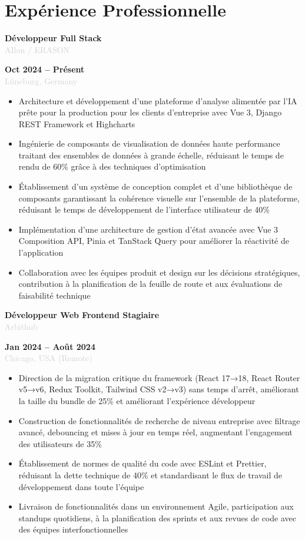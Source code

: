 \documentclass[10pt,a4paper]{article}
\newcommand{\Experience}[4]{%
  \vspace{2pt}
  \noindent
  \begin{minipage}[t]{0.70\textwidth}
    {\normalsize\textbf{\color{darkgray}#3}} \\
    \textcolor{lightgray}{\small #1}
  \end{minipage}%
  \hfill
  \begin{minipage}[t]{0.28\textwidth}
    \raggedleft
    \textcolor{mediumgray}{\small\textbf{#4}} \\
    \textcolor{lightgray}{\small #2}
  \end{minipage}
  \vspace{1pt}
}
\begin{document}
\section*{Expérience Professionnelle}

\Experience{AIlon / ERASON}{Lüneburg, Germany}{Développeur Full Stack}{Oct 2024 -- Présent}
\begin{itemize}
  \item Architecture et développement d'une plateforme d'analyse alimentée par l'IA prête pour la production pour les clients d'entreprise avec Vue 3, Django REST Framework et Highcharts
  \item Ingénierie de composants de visualisation de données haute performance traitant des ensembles de données à grande échelle, réduisant le temps de rendu de 60\% grâce à des techniques d'optimisation
  \item Établissement d'un système de conception complet et d'une bibliothèque de composants garantissant la cohérence visuelle sur l'ensemble de la plateforme, réduisant le temps de développement de l'interface utilisateur de 40\%
  \item Implémentation d'une architecture de gestion d'état avancée avec Vue 3 Composition API, Pinia et TanStack Query pour améliorer la réactivité de l'application
  \item Collaboration avec les équipes produit et design sur les décisions stratégiques, contribution à la planification de la feuille de route et aux évaluations de faisabilité technique
\end{itemize}

\Experience{Arbithub}{Chicago, USA (Remote)}{Développeur Web Frontend Stagiaire}{Jan 2024 -- Août 2024}
\begin{itemize}
  \item Direction de la migration critique du framework (React 17→18, React Router v5→v6, Redux Toolkit, Tailwind CSS v2→v3) sans temps d'arrêt, améliorant la taille du bundle de 25\% et améliorant l'expérience développeur
  \item Construction de fonctionnalités de recherche de niveau entreprise avec filtrage avancé, debouncing et mises à jour en temps réel, augmentant l'engagement des utilisateurs de 35\%
  \item Établissement de normes de qualité du code avec ESLint et Prettier, réduisant la dette technique de 40\% et standardisant le flux de travail de développement dans toute l'équipe
  \item Livraison de fonctionnalités dans un environnement Agile, participation aux standups quotidiens, à la planification des sprints et aux revues de code avec des équipes interfonctionnelles
\end{itemize}
\end{document}
